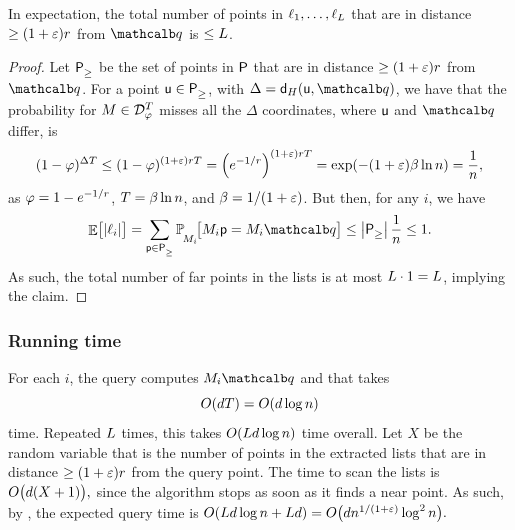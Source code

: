 \begin{lemma}
     In expectation, the total number of points in
        $\ell_1,\ldots, \ell_L$ that are in distance
        $\geq (1+{\varepsilon})r$ from $\query$ is $\leq L$.
\end{lemma}

\begin{proof}
    Let ${\mathsf{P}}^{}_{\geq}$ be the set of points in ${\mathsf{P}}$ that are in
    distance $\geq (1+{\varepsilon})r$ from $\query$.  For a point
    $\mathsf{u} \in {\mathsf{P}}^{}_{\geq}$, with $\Delta = \distH{\pntA}{ \query}$, we
    have that the probability for ${M} \in \mathcal{D}_{\varphi}^T$
    misses all the $\Delta$ coordinates, where $\mathsf{u}$ and $\query$
    differ, is
    \begin{equation*}
        (1-\pr)^{\Delta \tTimes}%
        \leq 
        (1-\pr)^{(1+\eps)\rad \tTimes}%
        =%
        \pth{e^{-1/r}}^{(1+\eps)\rad \tTimes}%
      =%
      \exp\pth{ -(1+\eps) \cTimes \ln n }%
      =%
      \frac{1}{n},
    \end{equation*}
    as $\varphi = 1-e^{-1/r}$, $T = \beta \ln n$, and
    $\beta = 1/(1+{\varepsilon})$. But then, for any $i$, we have
    \begin{equation*}
        \Ex{\bigl.\cardin{\ell_i}}%
        =%
        \sum_{\pnt \in \PSetFar}
        \ProbY{\bigl.\seq_i}{\seq_i \pnt = \seq_i \query }
        \leq%
        \cardin{\PSetFar} \frac{1}{n}
        \leq%
        1.
  \end{equation*}
    As such, the total number of far points in the lists is at most
    $L \cdot 1 = L$, implying the claim.
\end{proof}

\subsubsection{Running time}

For each $i$, the query computes $\seq_i \query$ and that takes
\[
O(d T) = O(d\log n)
\]
time. Repeated $L$ times, this takes
$O( L d \log n)$ time overall.  Let $X$ be the random variable
that is the number of points in the extracted lists that are in
distance $\geq (1+{\varepsilon})r$ from the query point.  The time to scan
the lists is
\begin{math}
    O\pth{\bigl. d( X +1) },
\end{math}
since the algorithm stops as soon as it finds a near point. As such,
by , the expected query time is
\begin{math}
    O( \DSTimes d \log n + \DSTimes d) = O\pth{d n^{1/(1+\eps)} \log^2
       n}.
\end{math}



